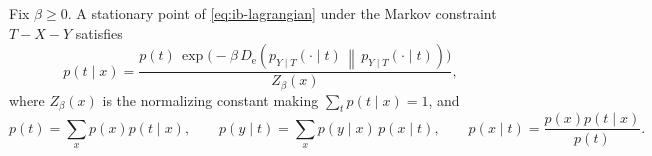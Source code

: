\documentclass{article}
\numberwithin{equation}{section}
\newcommand{\KLnat}[2]{D_{\mathrm{e}}\!\left(#2\,\middle\|\,#2\right)}
\begin{document}
\begin{theorem}
\label{thm:ib-fixed-point}
Fix $\beta\ge 0$.
A stationary point of \eqref{eq:ib-lagrangian} under the Markov constraint $T-X-Y$ satisfies
\begin{equation}
\label{eq:ib-update}
    p(t\mid x)
    = \frac{p(t)\,\exp\big(-\beta\,\KLnat{p_{Y\mid X}(\cdot\mid x)}{p_{Y\mid T}(\cdot\mid t)}\big)}{Z_\beta(x)},
\end{equation}
where $Z_\beta(x)$ is the normalizing constant making $\sum_t p(t\mid x)=1$, and
\begin{equation}
\label{eq:ib-consistency}
    p(t) = \sum_x p(x)p(t\mid x),
    \qquad
    p(y\mid t) = \sum_x p(y\mid x)\,p(x\mid t),
    \qquad
    p(x\mid t)=\frac{p(x)p(t\mid x)}{p(t)}.
\end{equation}
\end{theorem}
\end{document}

